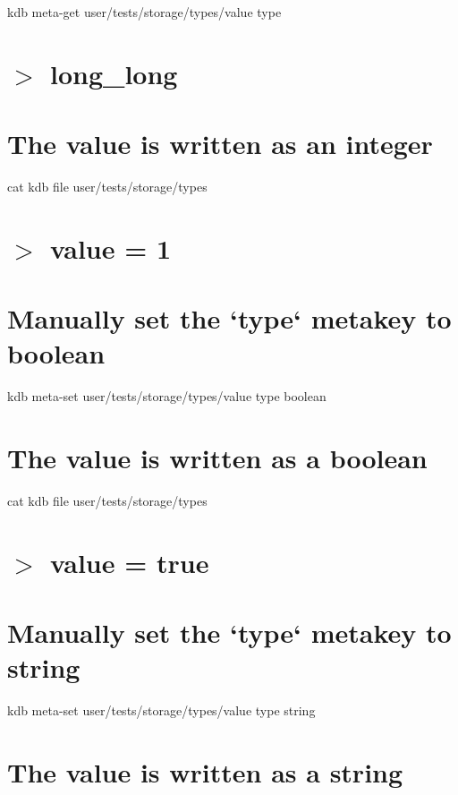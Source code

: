 kdb meta-\/get \textquotesingle{}user/tests/storage/types/value\textquotesingle{} \textquotesingle{}type\textquotesingle{} \hypertarget{autotoc_md693_autotoc_md716}{}\section{$>$ long\+\_\+long}\label{autotoc_md693_autotoc_md716}
\hypertarget{autotoc_md693_autotoc_md717}{}\section{The value is written as an integer}\label{autotoc_md693_autotoc_md717}
cat {\ttfamily kdb file user/tests/storage/types} \hypertarget{autotoc_md693_autotoc_md718}{}\section{$>$ value = 1}\label{autotoc_md693_autotoc_md718}
\hypertarget{autotoc_md693_autotoc_md719}{}\section{Manually set the `type` metakey to boolean}\label{autotoc_md693_autotoc_md719}
kdb meta-\/set \textquotesingle{}user/tests/storage/types/value\textquotesingle{} \textquotesingle{}type\textquotesingle{} \textquotesingle{}boolean\textquotesingle{}\hypertarget{autotoc_md693_autotoc_md720}{}\section{The value is written as a boolean}\label{autotoc_md693_autotoc_md720}
cat {\ttfamily kdb file user/tests/storage/types} \hypertarget{autotoc_md693_autotoc_md721}{}\section{$>$ value = true}\label{autotoc_md693_autotoc_md721}
\hypertarget{autotoc_md693_autotoc_md722}{}\section{Manually set the `type` metakey to string}\label{autotoc_md693_autotoc_md722}
kdb meta-\/set \textquotesingle{}user/tests/storage/types/value\textquotesingle{} \textquotesingle{}type\textquotesingle{} \textquotesingle{}string\textquotesingle{}\hypertarget{autotoc_md693_autotoc_md723}{}\section{The value is written as a string}\label{autotoc_md693_autotoc_md723}
